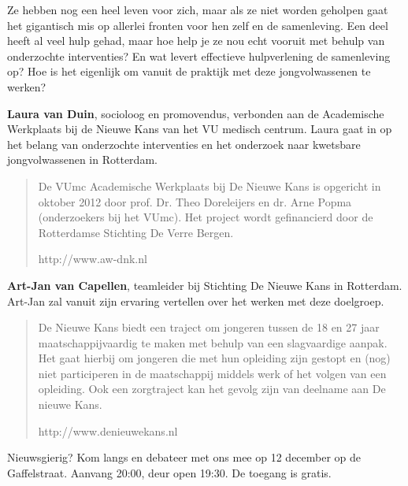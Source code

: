 \documentclass{article}
\begin{document}
\vfill

Ze hebben nog een heel leven voor zich, maar als ze niet worden geholpen gaat
het gigantisch mis op allerlei fronten voor hen zelf en de samenleving. Een
deel heeft al veel hulp gehad, maar hoe help je ze nou echt vooruit met behulp
van onderzochte interventies? En wat levert effectieve hulpverlening de
samenleving op? Hoe is het eigenlijk om vanuit de praktijk met deze
jongvolwassenen te werken?

\vfill


\vfill

\textbf{Laura van Duin},
  socioloog en promovendus, verbonden aan de Academische Werkplaats bij de
  Nieuwe Kans van het VU medisch centrum. Laura gaat in op het belang van
  onderzochte interventies en het onderzoek naar kwetsbare jongvolwassenen in
  Rotterdam.

  \begin{quote}
    De VUmc Academische Werkplaats bij De Nieuwe Kans is opgericht in oktober
    2012 door prof. Dr. Theo Doreleijers en dr. Arne Popma (onderzoekers bij
    het VUmc). Het project wordt gefinancierd door de Rotterdamse Stichting De
    Verre Bergen.

    http://www.aw-dnk.nl
  \end{quote}

\vfill

\textbf{Art-Jan van Capellen},
  teamleider bij Stichting De Nieuwe Kans in Rotterdam. Art-Jan zal vanuit zijn
  ervaring vertellen over het werken met deze doelgroep.

  \begin{quote}
    De Nieuwe Kans biedt een traject om jongeren tussen de 18 en 27 jaar
    maatschappijvaardig te maken met behulp van een slagvaardige aanpak. Het
    gaat hierbij om jongeren die met hun opleiding zijn gestopt en (nog) niet
    participeren in de maatschappij middels werk of het volgen van een
    opleiding. Ook een zorgtraject kan het gevolg zijn van deelname aan De
    nieuwe Kans.
    
    http://www.denieuwekans.nl
  \end{quote}

\vfill

Nieuwsgierig? Kom langs en debateer met ons mee op 12 december op de
Gaffelstraat. Aanvang 20:00, deur open 19:30. De toegang is gratis.

\myhline
\end{document}
